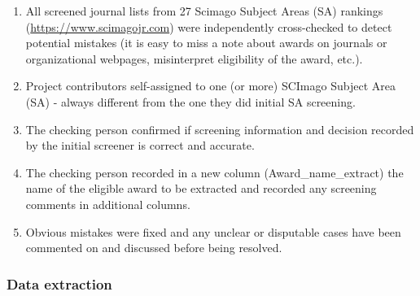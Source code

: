 \documentclass[
]{article}
\begin{document}
\begin{enumerate}
\def\labelenumi{\arabic{enumi}.}
\item
  All screened journal lists from 27 Scimago Subject Areas (SA) rankings
  (\url{https://www.scimagojr.com}) were independently cross-checked to
  detect potential mistakes (it is easy to miss a note about awards on
  journals or organizational webpages, misinterpret eligibility of the
  award, etc.).
\item
  Project contributors self-assigned to one (or more) SCImago Subject
  Area (SA) - always different from the one they did initial SA
  screening.
\item
  The checking person confirmed if screening information and decision
  recorded by the initial screener is correct and accurate.
\item
  The checking person recorded in a new column (Award\_name\_extract)
  the name of the eligible award to be extracted and recorded any
  screening comments in additional columns.
\item
  Obvious mistakes were fixed and any unclear or disputable cases have
  been commented on and discussed before being resolved.
\end{enumerate}

\hypertarget{data-extraction}{%
\subsubsection{Data extraction}\label{data-extraction}}
\end{document}
